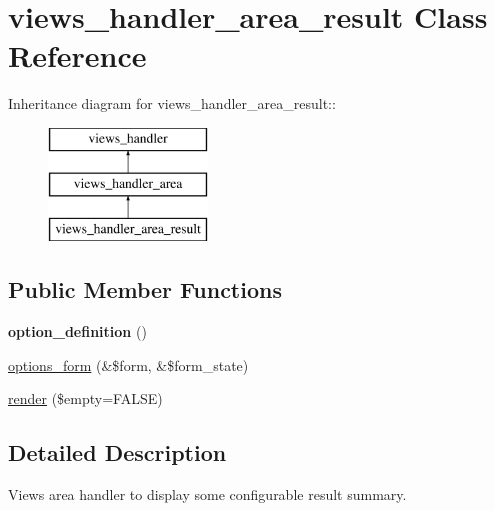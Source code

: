 \hypertarget{classviews__handler__area__result}{
\section{views\_\-handler\_\-area\_\-result Class Reference}
\label{classviews__handler__area__result}
}
Inheritance diagram for views\_\-handler\_\-area\_\-result::\begin{figure}[H]
\begin{center}
\leavevmode
\includegraphics[height=3cm]{classviews__handler__area__result}
\end{center}
\end{figure}
\subsection*{Public Member Functions}
\begin{DoxyCompactItemize}
\item 
\hypertarget{classviews__handler__area__result_aac05b8b73e67c922c2ed48dfd53516e9}{
{\bfseries option\_\-definition} ()}
\label{classviews__handler__area__result_aac05b8b73e67c922c2ed48dfd53516e9}

\item 
\hyperlink{classviews__handler__area__result_a8b6ec38182e50197cf1289acfac7b26e}{options\_\-form} (\&\$form, \&\$form\_\-state)
\item 
\hyperlink{classviews__handler__area__result_acd805154305ee5849da8251a4335c933}{render} (\$empty=FALSE)
\end{DoxyCompactItemize}


\subsection{Detailed Description}
Views area handler to display some configurable result summary. 

